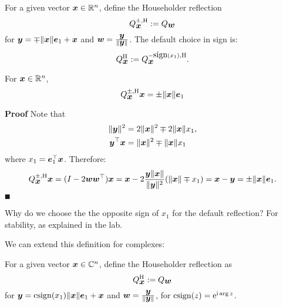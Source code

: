 \begin{definition} For a given vector $\bm{{\mbox{\boldmath$x$\unboldmath}}} \in {\mathbb R}^n$, define the Householder reflection
\[
Q_{\bm{{\mbox{\boldmath$x$\unboldmath}}}}^{\pm,\rm H} := Q_{\bm{{\mbox{\boldmath$w$\unboldmath}}}}
\]
for $\bm{{\mbox{\boldmath$y$\unboldmath}}} = \mp \|\bm{{\mbox{\boldmath$x$\unboldmath}}}\| \bm{{\mbox{\boldmath$e$\unboldmath}}}_1 + \bm{{\mbox{\boldmath$x$\unboldmath}}}$ and $\bm{{\mbox{\boldmath$w$\unboldmath}}} = {\bm{{\mbox{\boldmath$y$\unboldmath}}} \over \|\bm{{\mbox{\boldmath$y$\unboldmath}}}\|}$. The default choice in sign is:
\[
Q_{\bm{{\mbox{\boldmath$x$\unboldmath}}}}^{\rm H} := Q_{\bm{{\mbox{\boldmath$x$\unboldmath}}}}^{-\hbox{sign}(x_1),\rm H}.
\]
\end{definition}

\begin{lemma} For $\bm{{\mbox{\boldmath$x$\unboldmath}}} \in {\mathbb R}^n$,
\[
Q_{\bm{{\mbox{\boldmath$x$\unboldmath}}}}^{\pm,\rm H} \bm{{\mbox{\boldmath$x$\unboldmath}}} = \pm\|\bm{{\mbox{\boldmath$x$\unboldmath}}}\| \bm{{\mbox{\boldmath$e$\unboldmath}}}_1
\]
\end{lemma}
\textbf{Proof} Note that
\begin{align*}
\| \bm{{\mbox{\boldmath$y$\unboldmath}}} \|^2 &= 2\|\bm{{\mbox{\boldmath$x$\unboldmath}}}\|^2 \mp 2 \|\bm{{\mbox{\boldmath$x$\unboldmath}}}\| x_1, \\
\bm{{\mbox{\boldmath$y$\unboldmath}}}^\top \bm{{\mbox{\boldmath$x$\unboldmath}}} &= \|\bm{{\mbox{\boldmath$x$\unboldmath}}}\|^2 \mp  \|\bm{{\mbox{\boldmath$x$\unboldmath}}}\| x_1
\end{align*}
where $x_1 = \bm{{\mbox{\boldmath$e$\unboldmath}}}_1^\top \bm{{\mbox{\boldmath$x$\unboldmath}}}$. Therefore:
\[
Q_{\bm{{\mbox{\boldmath$x$\unboldmath}}}}^{\pm,\rm H} \bm{{\mbox{\boldmath$x$\unboldmath}}}  =  (I - 2 \bm{{\mbox{\boldmath$w$\unboldmath}}} \bm{{\mbox{\boldmath$w$\unboldmath}}}^\top) \bm{{\mbox{\boldmath$x$\unboldmath}}} = \bm{{\mbox{\boldmath$x$\unboldmath}}} - 2 {\bm{{\mbox{\boldmath$y$\unboldmath}}}  \|\bm{{\mbox{\boldmath$x$\unboldmath}}}\|  \over \|\bm{{\mbox{\boldmath$y$\unboldmath}}}\|^2} (\|\bm{{\mbox{\boldmath$x$\unboldmath}}}\|\mp x_1) = \bm{{\mbox{\boldmath$x$\unboldmath}}} - \bm{{\mbox{\boldmath$y$\unboldmath}}} =  \pm\|\bm{{\mbox{\boldmath$x$\unboldmath}}}\| \bm{{\mbox{\boldmath$e$\unboldmath}}}_1.
\]
\ensuremath{\QED}

Why do we choose the the opposite sign of $x_1$ for the default reflection? For stability, as explained in the lab.

We can extend this definition for complexes:

\begin{definition} For a given vector $\bm{{\mbox{\boldmath$x$\unboldmath}}} \in {\mathbb C}^n$, define the Householder reflection as
\[
Q_{\bm{{\mbox{\boldmath$x$\unboldmath}}}}^{\rm H} := Q_{\bm{{\mbox{\boldmath$w$\unboldmath}}}}
\]
for $\bm{{\mbox{\boldmath$y$\unboldmath}}} = {\rm csign}(x_1) \|\bm{{\mbox{\boldmath$x$\unboldmath}}}\| \bm{{\mbox{\boldmath$e$\unboldmath}}}_1 + \bm{{\mbox{\boldmath$x$\unboldmath}}}$ and $\bm{{\mbox{\boldmath$w$\unboldmath}}} = {\bm{{\mbox{\boldmath$y$\unboldmath}}} \over \|\bm{{\mbox{\boldmath$y$\unboldmath}}}\|}$, for ${\rm csign}(z) = {\rm e}^{{\rm i} \arg z}$.  \end{definition}

